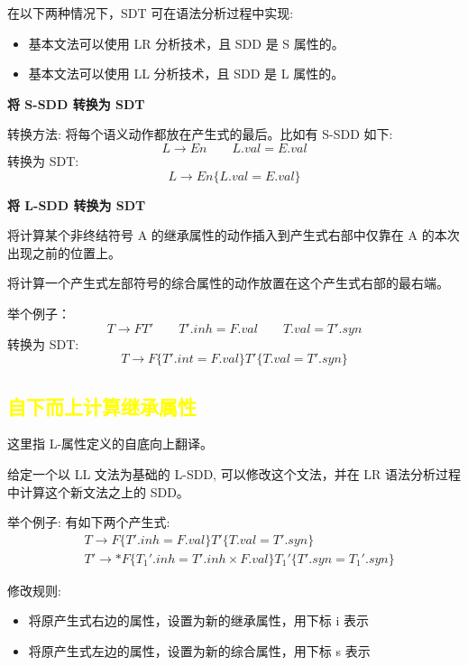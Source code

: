 在以下两种情况下，SDT 可在语法分析过程中实现:
\begin{itemize}
    \item 基本文法可以使用 LR 分析技术，且 SDD 是 S 属性的。
    \item 基本文法可以使用 LL 分析技术，且 SDD 是 L 属性的。
\end{itemize}

\noindent\textbf{将 S-SDD 转换为 SDT}

转换方法: 将每个语义动作都放在产生式的最后。比如有 S-SDD 如下:
\[L\rightarrow En  \qquad  L.val = E.val\]
转换为 SDT:
\[L \rightarrow En\{L.val = E.val\}\]

\noindent\textbf{\textcolor{imp}{将 L-SDD 转换为 SDT}}

将计算某个非终结符号 A 的继承属性的动作插入到产生式右部中仅靠在 A 的本次出现之前的位置上。

将计算一个产生式左部符号的综合属性的动作放置在这个产生式右部的最右端。

举个例子：
\[T\rightarrow FT' \qquad T'.inh = F.val \qquad T.val = T'.syn \]
转换为 SDT:
\[T \rightarrow F\{T'.int = F.val\}T'\{T.val = T'.syn\}\]

\subsection{\textcolor{mark}{自下而上计算继承属性}}

这里指 L-属性定义的自底向上翻译。

给定一个以 LL 文法为基础的 L-SDD, 可以修改这个文法，并在 LR 语法分析过程中计算这个新文法之上的 SDD。

举个例子: 有如下两个产生式:
\begin{equation}
    \begin{aligned}
         & T \rightarrow F\{T'.inh = F.val\} T' \{T.val = T'.syn\}                                     \\
         & T' \rightarrow *F\{T_1 '.inh = T'.inh \times F.val\} T_1 ' \{T'.syn = T_1 '.syn\} \nonumber
    \end{aligned}
\end{equation}

修改规则:
\begin{itemize}
    \item 将原产生式右边的属性，设置为新的继承属性，用下标 i 表示
    \item 将原产生式左边的属性，设置为新的综合属性，用下标 s 表示
\end{itemize}

